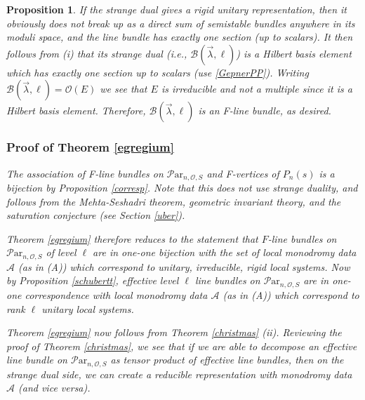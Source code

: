 \documentclass[11pt]{amsart}
\newcommand\ma{\mathcal{A}}
\newcommand\Par{\mathcal{P}\text{ar} }
\newtheorem{proposition}[theorem]{Proposition}
\numberwithin{theorem}{subsection}
\begin{document}
{\begin{proposition}
If the strange dual gives a rigid unitary representation, then it obviously does not break up as a direct sum of semistable bundles anywhere in its moduli space, and the line bundle has exactly one section (up to scalars). It then follows from (i) that its  strange dual (i.e., $\mathcal{B}(\vec{\lambda},\ell)$) is a Hilbert basis element which has exactly one section up to scalars (use \eqref{GepnerPP}). Writing $\mathcal{B}(\vec{\lambda},\ell)=\mathcal{O}(E)$ we see that $E$ is irreducible and not a multiple since it is a Hilbert basis element. Therefore, $\mathcal{B}(\vec{\lambda},\ell)$ is an F-line bundle, as desired.
\subsubsection{Proof of Theorem \ref{egregium}}
The association of F-line bundles on $\Par_{n,\mathcal{O},S}$ and F-vertices of $P_n(s)$ is a bijection by Proposition \ref{corresp}. Note that this does not use 
strange duality, and follows from the Mehta-Seshadri theorem, geometric invariant theory, and the saturation conjecture (see Section \ref{uber}). 

Theorem \ref{egregium}  therefore reduces to the statement  that $F$-line bundles on $\Par_{n,\mathcal{O},S}$ of level $\ell$ are in one-one bijection with the set of local monodromy data $\ma$ (as in (A)) which correspond to unitary, irreducible, rigid local systems. Now  by Proposition \ref{schubertt}, effective level $\ell$  line bundles on $\Par_{n,\mathcal{O},S}$ are in one-one correspondence with local monodromy data $\ma$ (as in (A)) which correspond to  rank $\ell$ unitary local systems. 


Theorem \ref{egregium} now follows from Theorem \ref{christmas} (ii). Reviewing the proof of Theorem \ref{christmas}, we see that if we are able to 
decompose an effective  line bundle on $\Par_{n,\mathcal{O},S}$ as tensor product of effective line bundles, then on the strange dual side, we can create a reducible representation with monodromy data $\mathcal{A}$ (and vice versa).



\end{proposition}}
\end{document}
